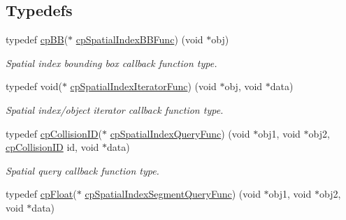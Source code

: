 \subsection*{Typedefs}
\begin{DoxyCompactItemize}
\item 
typedef \hyperlink{structcp_b_b}{cp\+B\+B}($\ast$ \hyperlink{group__cp_spatial_index_gaa8cf991cadcee1fbb6ee9379a0a6e0ea}{cp\+Spatial\+Index\+B\+B\+Func}) (void $\ast$obj)
\begin{DoxyCompactList}\small\item\em Spatial index bounding box callback function type. \end{DoxyCompactList}\item 
\hypertarget{group__cp_spatial_index_ga522e250b59a1802d3648085685d41f97}{}typedef void($\ast$ \hyperlink{group__cp_spatial_index_ga522e250b59a1802d3648085685d41f97}{cp\+Spatial\+Index\+Iterator\+Func}) (void $\ast$obj, void $\ast$data)\label{group__cp_spatial_index_ga522e250b59a1802d3648085685d41f97}

\begin{DoxyCompactList}\small\item\em Spatial index/object iterator callback function type. \end{DoxyCompactList}\item 
\hypertarget{group__cp_spatial_index_ga7bcf80d017b29d32d9f8011405b241f9}{}typedef \hyperlink{group__basic_types_ga89d4043ca0567e947aaca19cf9600df5}{cp\+Collision\+I\+D}($\ast$ \hyperlink{group__cp_spatial_index_ga7bcf80d017b29d32d9f8011405b241f9}{cp\+Spatial\+Index\+Query\+Func}) (void $\ast$obj1, void $\ast$obj2, \hyperlink{group__basic_types_ga89d4043ca0567e947aaca19cf9600df5}{cp\+Collision\+I\+D} id, void $\ast$data)\label{group__cp_spatial_index_ga7bcf80d017b29d32d9f8011405b241f9}

\begin{DoxyCompactList}\small\item\em Spatial query callback function type. \end{DoxyCompactList}\item 
\hypertarget{group__cp_spatial_index_ga829ef5f6fd840ea31370d53db9045373}{}typedef \hyperlink{group__basic_types_gac1ed65573e035bf892505768c852d8d3}{cp\+Float}($\ast$ \hyperlink{group__cp_spatial_index_ga829ef5f6fd840ea31370d53db9045373}{cp\+Spatial\+Index\+Segment\+Query\+Func}) (void $\ast$obj1, void $\ast$obj2, void $\ast$data)\label{group__cp_spatial_index_ga829ef5f6fd840ea31370d53db9045373}


\end{DoxyCompactItemize}
